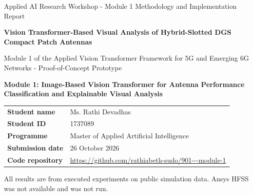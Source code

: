 \documentclass[11pt,a4paper]{article}
\begin{document}
\begin{titlepage}\centering\vspace*{2cm}
{\color{navy}\large Applied AI Research Workshop - Module 1 Methodology and Implementation Report\par}\vspace{0.8cm}
{\color{navy}\LARGE\bfseries Vision Transformer-Based Visual Analysis of Hybrid-Slotted DGS Compact Patch Antennas\par}\vspace{0.5cm}
{\large Module 1 of the Applied Vision Transformer Framework for 5G and Emerging 6G Networks - Proof-of-Concept Prototype\par}\vspace{1cm}
{\bfseries Module 1: Image-Based Vision Transformer for Antenna Performance Classification and Explainable Visual Analysis\par}\vspace{2cm}
\begin{tabular}{ll}
\textbf{Student name} & Ms. Rathi Devadhas \\
\textbf{Student ID} & 1737089 \\
\textbf{Programme} & Master of Applied Artificial Intelligence \\
\textbf{Submission date} & 26 October 2026 \\
\textbf{Code repository} & \url{https://github.com/rathiabeth-sudo/901---module-1} \\
\end{tabular}\vfill
{\small All results are from executed experiments on public simulation data. Ansys HFSS was not available and was not run.\par}
\end{titlepage}
\tableofcontents\newpage
\end{document}
